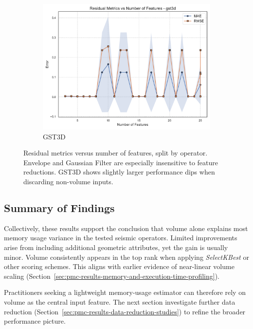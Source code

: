 \begin{figure}[htbp]
\begin{subfigure}[t]{0.32\textwidth}
        \includegraphics[width=\textwidth]{assets/images/05/residual_metrics_by_number_of_features_gst3d}
        \caption{\ac{GST3D}}
    \end{subfigure}
    \caption{Residual metrics versus number of features, split by operator.
    Envelope and Gaussian Filter are especially insensitive to feature reductions.
    \ac{GST3D} shows slightly larger performance dips when discarding non-volume inputs.}
    \label{fig:residual_metrics_by_number_of_features_operator_subplots}
\end{figure}

\subsection{Summary of Findings}
\label{subsec:feature-selection-summary}

Collectively, these results support the conclusion that volume alone explains most memory usage variance in the tested seismic operators.
Limited improvements arise from including additional geometric attributes, yet the gain is usually minor.
Volume consistently appears in the top rank when applying \emph{SelectKBest} or other scoring schemes.
This aligns with earlier evidence of near-linear volume scaling (Section~\ref{sec:pmc-results-memory-and-execution-time-profiling}).

Practitioners seeking a lightweight memory-usage estimator can therefore rely on volume as the central input feature.
The next section investigate further data reduction (Section~\ref{sec:pmc-results-data-reduction-studies}) to refine the broader performance picture.